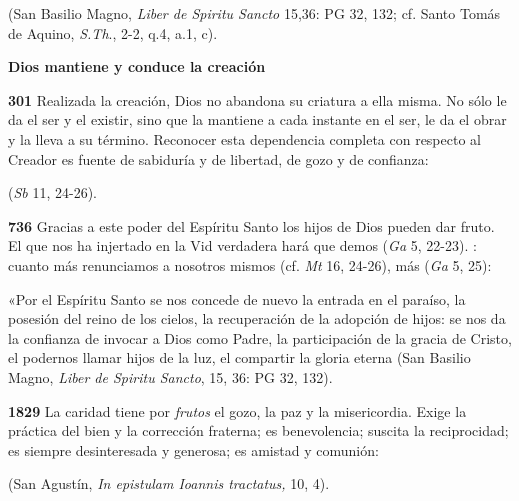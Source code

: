  (San Basilio Magno, \emph{Liber de Spiritu Sancto} 15,36: PG 32, 132; cf. Santo Tomás de Aquino, \emph{S.Th}., 2-2, q.4, a.1, c).

\textbf{Dios mantiene y conduce la creación}

\textbf{301} Realizada la creación, Dios no abandona su criatura a ella misma. No sólo le da el ser y el existir, sino que la mantiene a cada instante en el ser, le da el obrar y la lleva a su término. Reconocer esta dependencia completa con respecto al Creador es fuente de sabiduría y de libertad, de gozo y de confianza:

 (\emph{Sb} 11, 24-26).

\textbf{736} Gracias a este poder del Espíritu Santo los hijos de Dios pueden dar fruto. El que nos ha injertado en la Vid verdadera hará que demos  (\emph{Ga} 5, 22-23). : cuanto más renunciamos a nosotros mismos (cf. \emph{Mt} 16, 24-26), más  (\emph{Ga} 5, 25):

«Por el Espíritu Santo se nos concede de nuevo la entrada en el paraíso, la posesión del reino de los cielos, la recuperación de la adopción de hijos: se nos da la confianza de invocar a Dios como Padre, la participación de la gracia de Cristo, el podernos llamar hijos de la luz, el compartir la gloria eterna (San Basilio Magno, \emph{Liber de Spiritu Sancto}, 15, 36: PG 32, 132).

\textbf{1829} La caridad tiene por \emph{frutos} el gozo, la paz y la misericordia. Exige la práctica del bien y la corrección fraterna; es benevolencia; suscita la reciprocidad; es siempre desinteresada y generosa; es amistad y comunión:

 (San Agustín, \emph{In epistulam Ioannis tractatus,} 10, 4).

